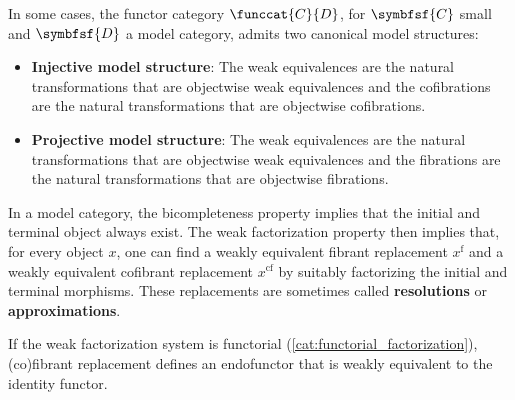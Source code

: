     \begin{example}\label{model:model_functor_category}
        In some cases, the functor category $\funccat{C}{D}$, for $\symbfsf{C}$ small and $\symbfsf{D}$ a model category, admits two canonical model structures:
        \begin{itemize}
            \item\textbf{Injective model structure}: The weak equivalences are the natural transformations that are objectwise weak equivalences and the cofibrations are the natural transformations that are objectwise cofibrations.
            \item\textbf{Projective model structure}: The weak equivalences are the natural transformations that are objectwise weak equivalences and the fibrations are the natural transformations that are objectwise fibrations.
        \end{itemize}
    \end{example}

    \begin{property}[Resolution]
        In a model category, the bicompleteness property implies that the initial and terminal object always exist. The weak factorization property then implies that, for every object $x$, one can find a weakly equivalent fibrant replacement $x^\mathrm{f}$ and a weakly equivalent cofibrant replacement $x^\mathrm{cf}$ by suitably factorizing the initial and terminal morphisms. These replacements are sometimes called \textbf{resolutions} or \textbf{approximations}.

        If the weak factorization system is functorial (\cref{cat:functorial_factorization}), (co)fibrant replacement defines an endofunctor that is weakly equivalent to the identity functor.
    \end{property}


